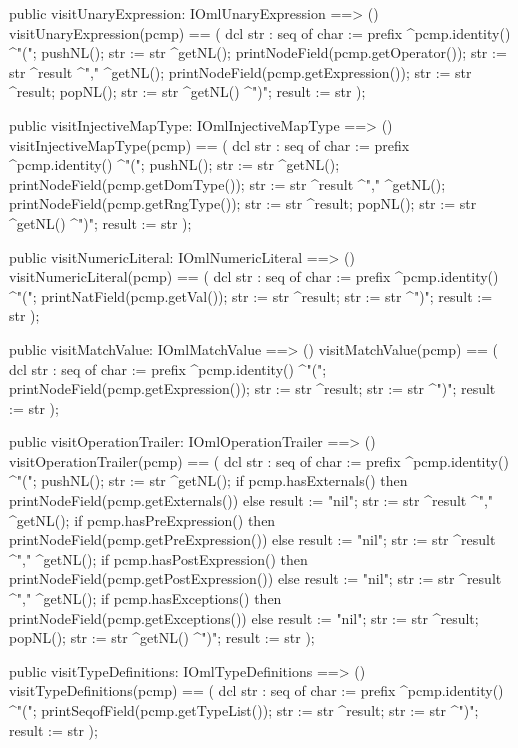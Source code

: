 \begin{vdm_al}
  public visitUnaryExpression: IOmlUnaryExpression ==> ()
  visitUnaryExpression(pcmp) ==
    ( dcl str : seq of char := prefix ^pcmp.identity() ^"(";
      pushNL();
      str := str ^getNL();
      printNodeField(pcmp.getOperator());
      str := str ^result ^"," ^getNL();
      printNodeField(pcmp.getExpression());
      str := str ^result;
      popNL();
      str := str ^getNL() ^")";
      result := str );

  public visitInjectiveMapType: IOmlInjectiveMapType ==> ()
  visitInjectiveMapType(pcmp) ==
    ( dcl str : seq of char := prefix ^pcmp.identity() ^"(";
      pushNL();
      str := str ^getNL();
      printNodeField(pcmp.getDomType());
      str := str ^result ^"," ^getNL();
      printNodeField(pcmp.getRngType());
      str := str ^result;
      popNL();
      str := str ^getNL() ^")";
      result := str );

  public visitNumericLiteral: IOmlNumericLiteral ==> ()
  visitNumericLiteral(pcmp) ==
    ( dcl str : seq of char := prefix ^pcmp.identity() ^"(";
      printNatField(pcmp.getVal());
      str := str ^result;
      str := str ^")";
      result := str );

  public visitMatchValue: IOmlMatchValue ==> ()
  visitMatchValue(pcmp) ==
    ( dcl str : seq of char := prefix ^pcmp.identity() ^"(";
      printNodeField(pcmp.getExpression());
      str := str ^result;
      str := str ^")";
      result := str );

  public visitOperationTrailer: IOmlOperationTrailer ==> ()
  visitOperationTrailer(pcmp) ==
    ( dcl str : seq of char := prefix ^pcmp.identity() ^"(";
      pushNL();
      str := str ^getNL();
      if pcmp.hasExternals()
      then printNodeField(pcmp.getExternals())
      else result := "nil";
      str := str ^result ^"," ^getNL();
      if pcmp.hasPreExpression()
      then printNodeField(pcmp.getPreExpression())
      else result := "nil";
      str := str ^result ^"," ^getNL();
      if pcmp.hasPostExpression()
      then printNodeField(pcmp.getPostExpression())
      else result := "nil";
      str := str ^result ^"," ^getNL();
      if pcmp.hasExceptions()
      then printNodeField(pcmp.getExceptions())
      else result := "nil";
      str := str ^result;
      popNL();
      str := str ^getNL() ^")";
      result := str );

  public visitTypeDefinitions: IOmlTypeDefinitions ==> ()
  visitTypeDefinitions(pcmp) ==
    ( dcl str : seq of char := prefix ^pcmp.identity() ^"(";
      printSeqofField(pcmp.getTypeList());
      str := str ^result;
      str := str ^")";
      result := str );


\end{vdm_al}

